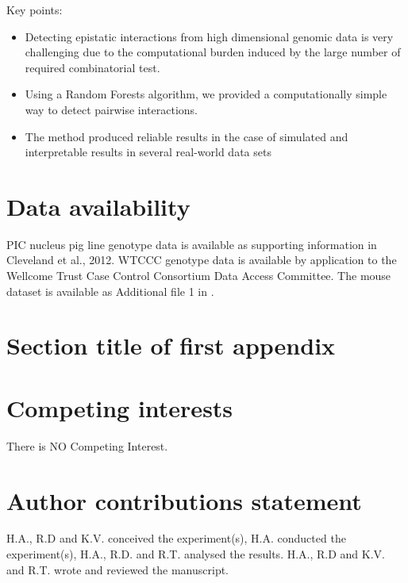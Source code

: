 \documentclass[authoryear,preprint,review,12pt]{elsarticle}
\begin{document}
Key points:
\begin{itemize}
\item Detecting epistatic interactions from high dimensional genomic data is very challenging due to the computational
  burden induced by the large number of required combinatorial test.
\item Using a Random Forests algorithm, we provided a computationally simple way to detect pairwise interactions.
\item The method produced reliable results in the case of simulated and interpretable results in several real-world
  data sets
\end{itemize}




\section{Data availability}
PIC nucleus pig line genotype data is available as supporting information in Cleveland et al., 2012. WTCCC genotype data
is available by application to the Wellcome Trust Case Control Consortium Data Access Committee. The mouse dataset is
available as Additional file 1 in \cite{martiniGenomicPredictionEpistasis2017}.




\FloatBarrier
\section{Section title of first appendix}\label{sec11}







\section{Competing interests}
There is NO Competing Interest.

\section{Author contributions statement}
H.A., R.D and K.V. conceived the experiment(s), H.A. conducted
the experiment(s), H.A., R.D. and R.T. analysed the results.  H.A., R.D and K.V. and R.T.  wrote and reviewed the manuscript.
\end{document}
